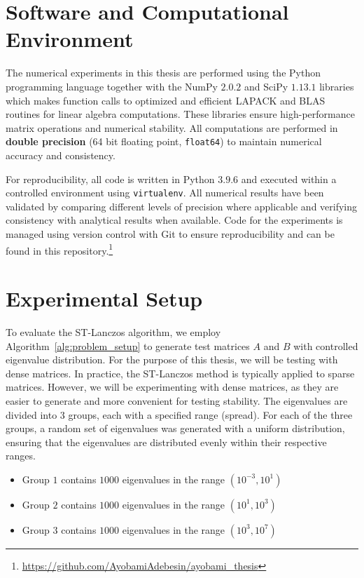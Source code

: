 \section{Software and Computational Environment}
The numerical experiments in this thesis are performed using the Python programming language together with the NumPy $2.0.2$ and SciPy $1.13.1$ libraries which makes function calls to optimized and efficient LAPACK and BLAS routines for linear algebra computations. These libraries ensure high-performance matrix operations and numerical stability. All computations are performed in \textbf{double precision} (64 bit floating point, \texttt{float64}) to maintain numerical accuracy and consistency.

For reproducibility, all code is written in Python $3.9.6$ and executed within a controlled environment using \texttt{virtualenv}. All numerical results have been validated by comparing different levels of precision where applicable and verifying consistency with analytical results when available. Code for the experiments is managed using version control with Git to ensure reproducibility and can be found in this repository.\footnote{\href{https://github.com/AyobamiAdebesin/ayobami_thesis}{https://github.com/AyobamiAdebesin/ayobami\_thesis}} 

\section{Experimental Setup}\label{sec:Well-Conditioned}
To evaluate the ST-Lanczos algorithm, we employ Algorithm~\ref{alg:problem_setup} to generate test matrices $A$ and $B$ with controlled eigenvalue distribution. For the purpose of this thesis, we will be testing with dense matrices. In practice, the ST-Lanczos method is typically applied to sparse matrices. However, we will be experimenting with dense matrices, as they are easier to generate and more convenient for testing stability. The eigenvalues are divided into 3 groups, each with a specified range (spread). For each of the three groups, a random set of eigenvalues was generated with a uniform distribution, ensuring that the eigenvalues are distributed evenly within their respective ranges.

\begin{itemize}
	\item[$\bullet$] Group $1$ contains $1000$ eigenvalues in the range $(10^{-3}, 10^{1})$
	\item[$\bullet$] Group $2$ contains $1000$ eigenvalues in the range $(10^1, 10^3)$
	\item[$\bullet$] Group $3$ contains $1000$ eigenvalues in the range $(10^3, 10^7)$
\end{itemize}

